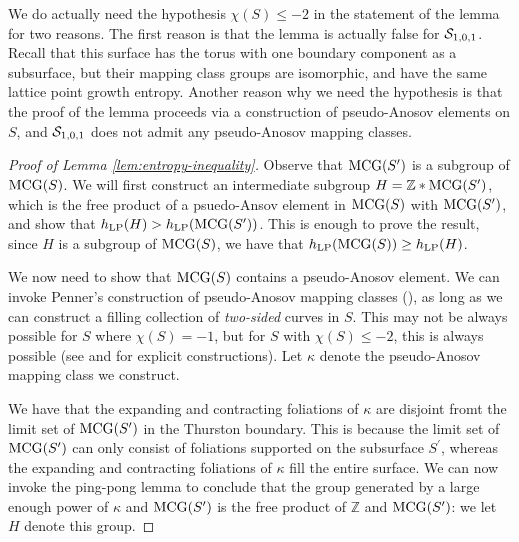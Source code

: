 \documentclass[12pt, reqno]{amsart}
\begin{document}
\begin{rem}
  We do actually need the hypothesis $\chi(S) \leq -2$ in the statement of the lemma for two reasons.
  The first reason is that the lemma is actually false for $\mathcal{S}_{1,0,1}$.
  Recall that this surface has the torus with one boundary component as a subsurface, but their mapping class groups are isomorphic, and have the same lattice point growth entropy.
  Another reason why we need the hypothesis is that the proof of the lemma proceeds via a construction of pseudo-Anosov elements on $S$, and $\mathcal{S}_{1,0,1}$ does not admit any pseudo-Anosov mapping classes.
\end{rem}

\begin{proof}[Proof of Lemma \ref{lem:entropy-inequality}]
  Observe that $\mathrm{MCG}(S^{\prime})$ is a subgroup of $\mathrm{MCG}(S)$.
  We will first construct an intermediate subgroup $H = \mathbb{Z} * \mathrm{MCG}(S^{\prime})$, which is the free product of a psuedo-Ansov element in $\mathrm{MCG}(S)$ with $\mathrm{MCG}(S^{\prime})$, and show that $h_{\mathrm{LP}}(H) > h_{\mathrm{LP}}(\mathrm{MCG}(S^{\prime}))$.
  This is enough to prove the result, since $H$ is a subgroup of $\mathrm{MCG}(S)$, we have that $h_{\mathrm{LP}}(\mathrm{MCG}(S)) \geq h_{\mathrm{LP}}(H)$.

  We now need to show that $\mathrm{MCG}(S)$ contains a pseudo-Anosov element.
  We can invoke Penner's construction of pseudo-Anosov mapping classes (\cite[Theorem 4.1]{penner1988construction}), as long as we can construct a filling collection of \emph{two-sided} curves in $S$.
  This may not be always possible for $S$ where $\chi(S) = -1$, but for $S$ with $\chi(S) \leq -2$, this is always possible (see \cite{Liechti2018MinimalPS} and \cite{khan2023pseudo} for explicit constructions).
  Let $\kappa$ denote the pseudo-Anosov mapping class we construct.

  We have that the expanding and contracting foliations of $\kappa$ are disjoint fromt the limit set of $\mathrm{MCG}(S^{\prime})$ in the Thurston boundary.
  This is because the limit set of $\mathrm{MCG}(S^{\prime})$ can only consist of foliations supported on the subsurface $S^{\prime}$, whereas the expanding and contracting foliations of $\kappa$ fill the entire surface.
  We can now invoke the ping-pong lemma to conclude that the group generated by a large enough power of $\kappa$ and $\mathrm{MCG}(S^{\prime})$ is the free product of $\mathbb{Z}$ and $\mathrm{MCG}(S^{\prime})$: we let $H$ denote this group.


\end{proof}
\end{document}
